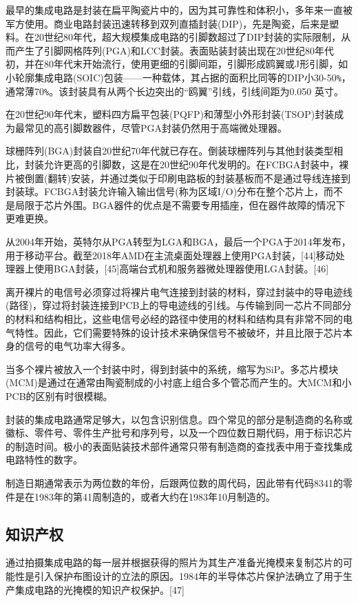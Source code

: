 最早的集成电路是封装在扁平陶瓷片中的，因为其可靠性和体积小，多年来一直被军方使用。商业电路封装迅速转移到双列直插封装(DIP)，先是陶瓷，后来是塑料。在20世纪80年代，超大规模集成电路的引脚数超过了DIP封装的实际限制，从而产生了引脚网格阵列(PGA)和LCC封装。表面贴装封装出现在20世纪80年代初，并在80年代末开始流行，使用更细的引脚间距，引脚形成鸥翼或J形引脚，如小轮廓集成电路(SOIC)包装——一种载体，其占据的面积比同等的DIP小30-50\verb`%`，通常薄70\verb`%`。该封装具有从两个长边突出的“鸥翼”引线，引线间距为0.050 英寸。

在20世纪90年代末，塑料四方扁平包装(PQFP)和薄型小外形封装(TSOP)封装成为最常见的高引脚数器件，尽管PGA封装仍然用于高端微处理器。

球栅阵列(BGA)封装自20世纪70年代就已存在。倒装球栅阵列与其他封装类型相比，封装允许更高的引脚数，这是在20世纪90年代发明的。在FCBGA封装中，裸片被倒置(翻转)安装，并通过类似于印刷电路板的封装基板而不是通过导线连接到封装球。FCBGA封装允许输入输出信号(称为区域I/O)分布在整个芯片上，而不是局限于芯片外围。BGA器件的优点是不需要专用插座，但在器件故障的情况下更难更换。

从2004年开始，英特尔从PGA转型为LGA和BGA，最后一个PGA于2014年发布，用于移动平台。截至2018年AMD在主流桌面处理器上使用PGA封装，[44]移动处理器上使用BGA封装，[45]高端台式机和服务器微处理器使用LGA封装。[46]

离开裸片的电信号必须穿过将裸片电气连接到封装的材料，穿过封装中的导电迹线(路径)，穿过将封装连接到PCB上的导电迹线的引线。与传输到同一芯片不同部分的材料和结构相比，这些电信号必经的路径中使用的材料和结构具有非常不同的电气特性。因此，它们需要特殊的设计技术来确保信号不被破坏，并且比限于芯片本身的信号的电气功率大得多。

当多个裸片被放入一个封装中时，得到封装中的系统，缩写为SiP。多芯片模块(MCM)是通过在通常由陶瓷制成的小衬底上组合多个管芯而产生的。大MCM和小PCB的区别有时很模糊。

封装的集成电路通常足够大，以包含识别信息。四个常见的部分是制造商的名称或徽标、零件号、零件生产批号和序列号，以及一个四位数日期代码，用于标识芯片的制造时间。极小的表面贴装技术部件通常只带有制造商的查找表中用于查找集成电路特性的数字。

制造日期通常表示为两位数的年份，后跟两位数的周代码，因此带有代码8341的零件是在1983年的第41周制造的，或者大约在1983年10月制造的。

\subsection{知识产权}

通过拍摄集成电路的每一层并根据获得的照片为其生产准备光掩模来复制芯片的可能性是引入保护布图设计的立法的原因。1984年的半导体芯片保护法确立了用于生产集成电路的光掩模的知识产权保护。[47]

